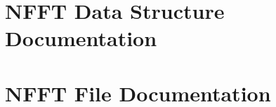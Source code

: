 \documentclass[a4paper]{book}
\begin{document}
\chapter{NFFT Data Structure Documentation}























\chapter{NFFT File Documentation}






















\printindex
\end{document}
